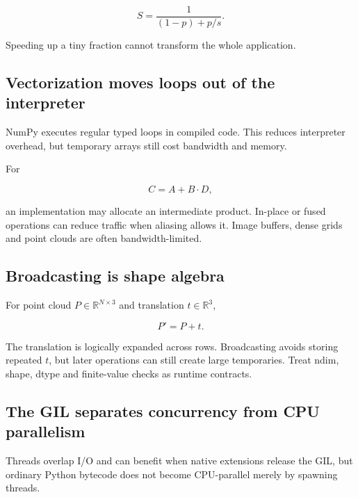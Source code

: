 \[
S=\frac{1}{(1-p)+p/s}.
\]

Speeding up a tiny fraction cannot transform the whole application.

\subsection{Vectorization moves loops out of the interpreter}\label{01-foundations-i-ch017-vectorization-moves-loops-out-of-the-interpreter}

\hypertarget{01-foundations-i-ch017-vectorization-moves-loops-out-of-the-interpreter}{}

NumPy executes regular typed loops in compiled code. This reduces interpreter overhead, but temporary arrays still cost bandwidth and memory.

For

\[
C=A+B\cdot D,
\]

an implementation may allocate an intermediate product. In-place or fused operations can reduce traffic when aliasing allows it. Image buffers, dense grids and point clouds are often bandwidth-limited.

\subsection{Broadcasting is shape algebra}\label{01-foundations-i-ch017-broadcasting-is-shape-algebra}

\hypertarget{01-foundations-i-ch017-broadcasting-is-shape-algebra}{}

For point cloud \(P\in\mathbb R^{N\times3}\) and translation \(t\in\mathbb R^3\),

\[
P'=P+t.
\]

The translation is logically expanded across rows. Broadcasting avoids storing repeated \(t\), but later operations can still create large temporaries. Treat ndim, shape, dtype and finite-value checks as runtime contracts.

\subsection{The GIL separates concurrency from CPU parallelism}\label{01-foundations-i-ch017-the-gil-separates-concurrency-from-cpu-parallelism}

\hypertarget{01-foundations-i-ch017-the-gil-separates-concurrency-from-cpu-parallelism}{}

Threads overlap I/O and can benefit when native extensions release the GIL, but ordinary Python bytecode does not become CPU-parallel merely by spawning threads.

